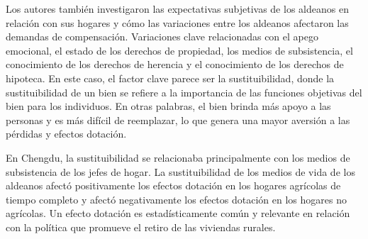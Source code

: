 \documentclass[cm,linguex]{glossa}
\begin{document}
Los autores también investigaron las expectativas subjetivas de los
aldeanos en relación con sus hogares y cómo las variaciones entre los
aldeanos afectaron las demandas de compensación. Variaciones clave
relacionadas con el apego emocional, el estado de los derechos de
propiedad, los medios de subsistencia, el conocimiento de los derechos
de herencia y el conocimiento de los derechos de hipoteca. En este caso,
el factor clave parece ser la sustituibilidad, donde la sustituibilidad
de un bien se refiere a la importancia de las funciones objetivas del
bien para los individuos. En otras palabras, el bien brinda más apoyo a
las personas y es más difícil de reemplazar, lo que genera una mayor
aversión a las pérdidas y efectos dotación.

En Chengdu, la sustituibilidad se relacionaba principalmente con los
medios de subsistencia de los jefes de hogar. La sustituibilidad de los
medios de vida de los aldeanos afectó positivamente los efectos dotación
en los hogares agrícolas de tiempo completo y afectó negativamente los
efectos dotación en los hogares no agrícolas. Un efecto dotación es
estadísticamente común y relevante en relación con la política que
promueve el retiro de las viviendas rurales.


\end{document}
